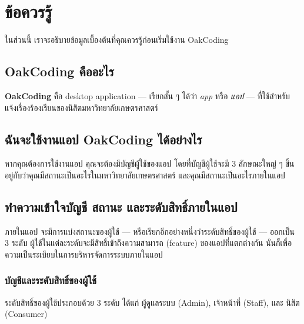 \documentclass[../docs.tex]{subfiles}
\begin{document}
\section*{ข้อควรรู้}

ในส่วนนี้ เราจะอธิบายข้อมูลเบื้องต้นที่คุณควรรู้ก่อนเริ่มใช้งาน OakCoding

\rule{0em}{1ex}
\subsection*{OakCoding คืออะไร}
\textbf{OakCoding} คือ desktop application --- เรียกสั้น ๆ ได้ว่า \textit{app} หรือ \textit{แอป} --- ที่ใช้สำหรับ\\
แจ้งเรื่องร้องเรียนของนิสิตมหาวิทยาลัยเกษตรศาสตร์

\rule{0em}{1ex}
\subsection*{ฉันจะใช้งานแอป OakCoding ได้อย่างไร}
หากคุณต้องการใช้งานแอป คุณจะต้องมีบัญชีผู้ใช้ของแอป โดยที่บัญชีผู้ใช้จะมี 3 ลักษณะใหญ่ ๆ ขึ้นอยู่กับว่าคุณมีสถานะเป็นอะไรในมหาวิทยาลัยเกษตรศาสตร์
และคุณมีสถานะเป็นอะไรภายในแอป

\rule{0em}{1ex}
\subsection*{ทำความเข้าใจบัญชี สถานะ และระดับสิทธิ์ภายในแอป}
ภายในแอป จะมีการแบ่งสถานะของผู้ใช้ --- หรือเรียกอีกอย่างหนึ่งว่าระดับสิทธิ์ของผู้ใช้ --- ออกเป็น 3 ระดับ
ผู้ใช้ในแต่ละระดับจะมีสิทธิ์เข้าถึงความสามารถ (feature) ของแอปที่แตกต่างกัน นั่นก็เพื่อความเป็นระเบียบในการบริหารจัดการระบบภายในแอป

\newpage

\subsubsection*{บัญชีและระดับสิทธิ์ของผู้ใช้}
ระดับสิทธิ์ของผู้ใช้ประกอบด้วย 3 ระดับ  ได้แก่ ผู้ดูแลระบบ (Admin), เจ้าหน้าที่ (Staff), และ นิสิต (Consumer)
\end{document}
